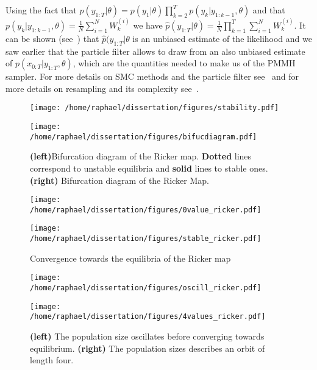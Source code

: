 \documentclass{article}
\begin{document}
	Using the fact that $p(y_{1:T}| \theta) = p(y_1|\theta)\prod_{k=2}^{T}p(y_k|y_{1:k-1}, \theta)$ and that \\
	$p(y_k|y_{1:k-1}, \theta) = \frac{1}{N}\sum_{i=1}^{N}W_k^{(i)}$ we have $\hat{p}(y_{1:T}| \theta)=\frac{1}{N}\prod_{k=1}^{T}\sum_{i=1}^{N}W_k^{(i)}$. It can be shown (see~\cite{del2004feynman}) that $\hat{p}(y_{1:T}| \theta$ is an unbiased estimate of the likelihood and we saw earlier that the particle filter allows to draw from an also unbiased estimate of $p(x_{0:T}|y_{1:T}, \theta)$, which are the quantities needed to make us of the PMMH sampler. For more details on SMC methods and the particle filter see~\cite{doucet2009tutorial} and for more details on resampling and its complexity see~\cite{murray2013parallel}.
	
	
	\begin{figure}[htb]
		\centering
		\begin{minipage}{0.4\textwidth}
			\centering
			\texttt{[image: /home/raphael/dissertation/figures/stability.pdf]}
		\end{minipage}
		\begin{minipage}{0.4\textwidth}
			\centering
			\texttt{[image: /home/raphael/dissertation/figures/bifucdiagram.pdf]}
		\end{minipage}
		\caption{\textbf{(left)}Bifurcation diagram of the Ricker map. \textbf{Dotted} lines correspond to unstable equilibria and \textbf{solid} lines to stable ones. \textbf{(right)} Bifurcation diagram of the Ricker Map.}
		\label{fig:stability}
	\end{figure}

	\begin{figure}[htb]
		\centering
		\begin{minipage}{0.4\textwidth}
			\centering
			\texttt{[image: /home/raphael/dissertation/figures/0value\_ricker.pdf]}
		\end{minipage}
		\begin{minipage}{0.4\textwidth}
			\centering
			\texttt{[image: /home/raphael/dissertation/figures/stable\_ricker.pdf]}
		\end{minipage}
		\caption{Convergence towards the equilibria of the Ricker map}
		\label{fig:stab}
	\end{figure}

	\begin{figure}[htb]
		\centering
		\begin{minipage}{0.4\textwidth}
			\centering
			\texttt{[image: /home/raphael/dissertation/figures/oscill\_ricker.pdf]}
		\end{minipage}
		\begin{minipage}{0.4\textwidth}
			\centering
			\texttt{[image: /home/raphael/dissertation/figures/4values\_ricker.pdf]}
		\end{minipage}
		\caption{\textbf{(left)} The population size oscillates before converging towards equilibrium. \textbf{(right)} The population sizes describes an orbit of length four.}
		\label{fig:oscill}
	\end{figure}
	
\end{document}
